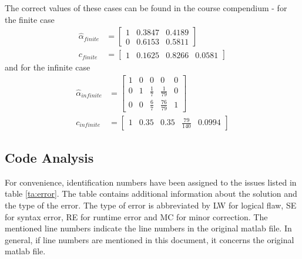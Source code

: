 The correct values of these cases can be found in the course compendium - for the finite case
\begin{align*}
\hat{\alpha}_{finite} &= 
\begin{bmatrix}
1 & 0.3847 & 0.4189\\
0 & 0.6153 & 0.5811
\end{bmatrix}\\
c_{finite} &= 
\begin{bmatrix}
1 & 0.1625 & 0.8266 & 0.0581
\end{bmatrix}
\end{align*}
and for the infinite case
\begin{align*}
\hat{\alpha}_{infinite} &= 
\begin{bmatrix}
1 & 0 & 0 & 0 & 0\\
0 & 1 & \frac{1}{7} & \frac{1}{79} &0\\
0 & 0 & \frac{6}{7} & \frac{76}{79} & 1
\end{bmatrix}\\
c_{infinite} &= 
\begin{bmatrix}
1 & 0.35 & 0.35 & \frac{79}{140} & 0.0994
\end{bmatrix}
\end{align*}
\newpage

\subsection{Code Analysis}
For convenience, identification numbers have been assigned to the issues listed in table \ref{ta:error}. The table contains additional information about the solution and the type of the error. The type of error is abbreviated by LW for logical flaw, SE for syntax error, RE for runtime error and MC for minor correction. The mentioned line numbers indicate the line numbers in the original matlab file. In general, if line numbers are mentioned in this document, it concerns the original matlab file. 

